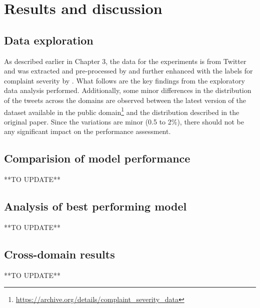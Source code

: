 \chapter{Results and discussion}

\section{Data exploration}
As described earlier in Chapter 3, the data for the experiments is from Twitter and was extracted and pre-processed by \cite{preotiuc-pietro_automatically_2019} and further enhanced with the labels for complaint severity by \cite{jinModelingSeverityComplaints2021}. What follows are the key findings from the exploratory data analysis performed. Additionally, some minor differences in the distribution of the tweets across the domains are observed between the latest version of the dataset available in the public domain\footnote{\url{https://archive.org/details/complaint_severity_data}} and the distribution described in the original paper. Since the variations are minor (0.5 to 2\%), there should not be any significant impact on the performance assessment.

\section{Comparision of model performance}
**TO UPDATE**

\section{Analysis of best performing model}
**TO UPDATE**

\section{Cross-domain results}
**TO UPDATE**